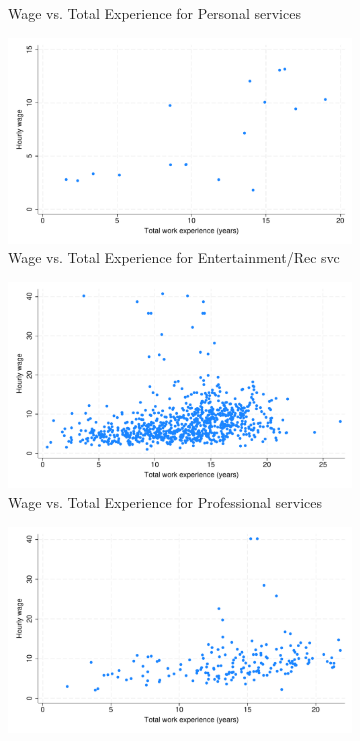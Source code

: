 \documentclass{article}
\begin{document}
\begin{figure}[H]
\begin{subfigure}{.3\textwidth}
  \caption{Wage vs. Total Experience for Personal services}
\end{subfigure}
\begin{subfigure}{.3\textwidth}
  \includegraphics[width = 1.00\textwidth]{./figures/scatter_wage_ind10.pdf}  
  \caption{Wage vs. Total Experience for Entertainment/Rec svc}
\end{subfigure}
\begin{subfigure}{.3\textwidth}
  \includegraphics[width = 1.00\textwidth]{./figures/scatter_wage_ind11.pdf}  
  \caption{Wage vs. Total Experience for Professional services}
\end{subfigure}
\begin{subfigure}{.3\textwidth}
  \includegraphics[width = 1.00\textwidth]{./figures/scatter_wage_ind12.pdf}  

\end{subfigure}
\end{figure}
\end{document}

